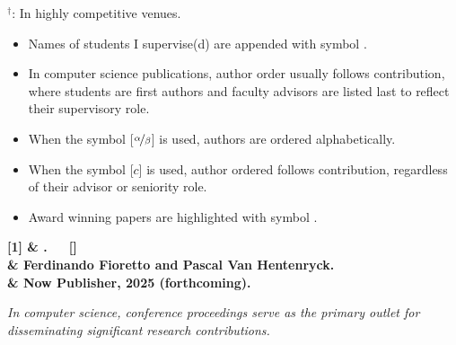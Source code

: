 {\hspace{10pt}
$^{\dagger}$: In highly competitive venues. 
\begin{itemize}[left=10pt]
\item Names of students I supervise(d) are appended with symbol \student{}.
\item In computer science publications, author order usually follows contribution, where students are first authors and faculty advisors are listed last to reflect their supervisory role. 
\item When the symbol [$\nicefrac{\alpha}{\beta}$] is used, authors are ordered alphabetically. 
\item When the symbol [$c$] is used, author ordered follows contribution, regardless of their advisor or seniority role. 
\item Award winning papers are highlighted with symbol \color{purple}{\faTrophy}. 
\end{itemize}
}

\begin{pubs}
\bf{[1]}	& .~~~[\link{}{\footnotesize{\faLink}}] \\
		&  {\bf Ferdinando Fioretto} and Pascal Van Hentenryck. \\ 
	& Now Publisher, 2025 (forthcoming).\\[0.5em]
\end{pubs}


\smallskip
{\it In computer science, conference proceedings serve as the primary outlet for disseminating significant research contributions.
}

